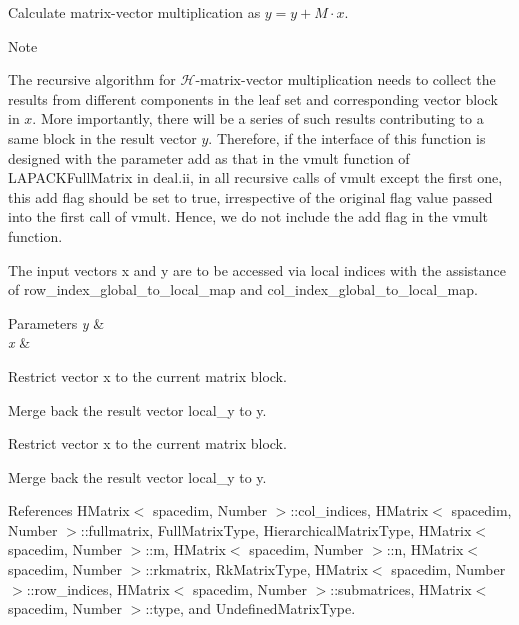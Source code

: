 Calculate matrix-\/vector multiplication as $y = y + M \cdot x$.


\begin{DoxyDescription}
\item[Note ]
\begin{DoxyEnumerate}
\item The recursive algorithm for $\mathcal{H}$-\/matrix-\/vector multiplication needs to collect the results from different components in the leaf set and corresponding vector block in $x$. More importantly, there will be a series of such results contributing to a same block in the result vector $y$. Therefore, if the interface of this function is designed with the parameter {\ttfamily add} as that in the {\ttfamily vmult} function of {\ttfamily L\+A\+P\+A\+C\+K\+Full\+Matrix} in deal.\+ii, in all recursive calls of {\ttfamily vmult} except the first one, this {\ttfamily add} flag should be set to {\ttfamily true}, irrespective of the original flag value passed into the first call of {\ttfamily vmult}. Hence, we do not include the {\ttfamily add} flag in the {\ttfamily vmult} function.
\item The input vectors {\ttfamily x} and {\ttfamily y} are to be accessed via local indices with the assistance of {\ttfamily row\+\_\+index\+\_\+global\+\_\+to\+\_\+local\+\_\+map} and {\ttfamily col\+\_\+index\+\_\+global\+\_\+to\+\_\+local\+\_\+map}. 
\end{DoxyEnumerate}
\end{DoxyDescription}


\begin{DoxyParams}{Parameters}
{\em y} & \\
\hline
{\em x} & \\
\hline
\end{DoxyParams}
Restrict vector x to the current matrix block.

Merge back the result vector {\ttfamily local\+\_\+y} to {\ttfamily y}.

Restrict vector x to the current matrix block.

Merge back the result vector {\ttfamily local\+\_\+y} to {\ttfamily y}.

References H\+Matrix$<$ spacedim, Number $>$\+::col\+\_\+indices, H\+Matrix$<$ spacedim, Number $>$\+::fullmatrix, Full\+Matrix\+Type, Hierarchical\+Matrix\+Type, H\+Matrix$<$ spacedim, Number $>$\+::m, H\+Matrix$<$ spacedim, Number $>$\+::n, H\+Matrix$<$ spacedim, Number $>$\+::rkmatrix, Rk\+Matrix\+Type, H\+Matrix$<$ spacedim, Number $>$\+::row\+\_\+indices, H\+Matrix$<$ spacedim, Number $>$\+::submatrices, H\+Matrix$<$ spacedim, Number $>$\+::type, and Undefined\+Matrix\+Type.

